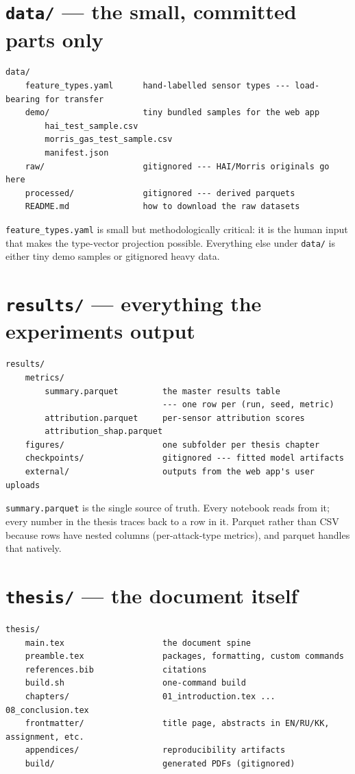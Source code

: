 \documentclass[11pt,a4paper]{article}
\newcommand{\code}[1]{\texttt{#1}}
\begin{document}
\section{\texttt{data/} --- the small, committed parts only}

\begin{Verbatim}
data/
    feature_types.yaml      hand-labelled sensor types --- load-bearing for transfer
    demo/                   tiny bundled samples for the web app
        hai_test_sample.csv
        morris_gas_test_sample.csv
        manifest.json
    raw/                    gitignored --- HAI/Morris originals go here
    processed/              gitignored --- derived parquets
    README.md               how to download the raw datasets
\end{Verbatim}

\code{feature\_types.yaml} is small but methodologically critical: it is the human input that makes the type-vector projection possible. Everything else under \code{data/} is either tiny demo samples or gitignored heavy data.

\section{\texttt{results/} --- everything the experiments output}

\begin{Verbatim}
results/
    metrics/
        summary.parquet         the master results table
                                --- one row per (run, seed, metric)
        attribution.parquet     per-sensor attribution scores
        attribution_shap.parquet
    figures/                    one subfolder per thesis chapter
    checkpoints/                gitignored --- fitted model artifacts
    external/                   outputs from the web app's user uploads
\end{Verbatim}

\code{summary.parquet} is the single source of truth. Every notebook reads from it; every number in the thesis traces back to a row in it. Parquet rather than CSV because rows have nested columns (per-attack-type metrics), and parquet handles that natively.

\section{\texttt{thesis/} --- the document itself}

\begin{Verbatim}
thesis/
    main.tex                    the document spine
    preamble.tex                packages, formatting, custom commands
    references.bib              citations
    build.sh                    one-command build
    chapters/                   01_introduction.tex ... 08_conclusion.tex
    frontmatter/                title page, abstracts in EN/RU/KK, assignment, etc.
    appendices/                 reproducibility artifacts
    build/                      generated PDFs (gitignored)
\end{Verbatim}
\end{document}
